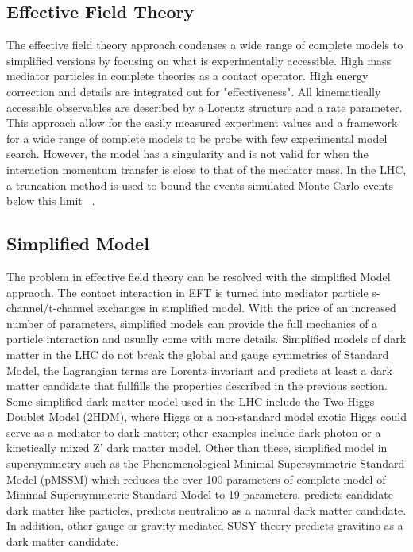 \subsection{Effective Field Theory}
The effective field theory approach condenses a wide range of complete models to simplified versions by focusing on what is experimentally accessible. High mass mediator particles in complete theories as a contact operator. High energy correction and details are integrated out for "effectiveness". All kinematically accessible observables are described by a Lorentz structure and a rate parameter. 
This approach allow for the easily measured experiment values and a framework for a wide range of complete models to be probe with few experimental model search. However, the model has a singularity and is not valid for when the interaction momentum transfer is close to that of the mediator mass. In the LHC, a truncation method is used to bound the events simulated Monte Carlo events below this limit ~\cite{Busoni_2014}.

\subsection{Simplified Model}
The problem in effective field theory can be resolved with the simplified Model appraoch. The contact interaction in EFT is turned into mediator particle s-channel/t-channel exchanges in simplified model. With the price of an increased number of parameters, simplified models can provide the full mechanics of a particle interaction and usually come with more details. 
Simplified models of dark matter in the LHC do not break the global and gauge symmetries of Standard Model, the Lagrangian terms are Lorentz invariant and predicts at least a dark matter candidate that fullfills the properties described in the previous section. 
Some simplified dark matter model used in the LHC include the Two-Higgs Doublet Model (2HDM), where Higgs or a non-standard model exotic Higgs could serve as a mediator to dark matter; other examples include dark photon or a kinetically mixed Z' dark matter model. 
Other than these, simplified model in supersymmetry such as the Phenomenological Minimal Supersymmetric Standard Model (pMSSM) which reduces the over 100 parameters of complete model of Minimal Supersymmetric Standard Model to 19 parameters, predicts candidate dark matter like particles, predicts neutralino as a natural dark matter candidate. 
In addition, other gauge or gravity mediated SUSY theory predicts gravitino as a dark matter candidate. 

